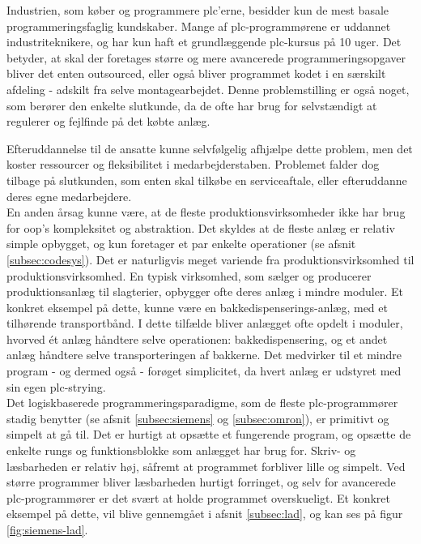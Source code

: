 \noindent Industrien, som køber og programmere \gls{plc}'erne, besidder kun de mest basale programmeringsfaglig kundskaber. Mange af \gls{plc}-programmørene er uddannet industriteknikere, og har kun haft et grundlæggende \gls{plc}-kursus på 10 uger. Det betyder, at skal der foretages større og mere avancerede programmeringsopgaver bliver det enten outsourced, eller også bliver programmet kodet i en særskilt afdeling - adskilt fra selve montagearbejdet. Denne problemstilling er også noget, som berører den enkelte slutkunde, da de ofte har brug for selvstændigt at regulerer og fejlfinde på det købte anlæg.

Efteruddannelse til de ansatte kunne selvfølgelig afhjælpe dette problem, men det koster ressourcer og fleksibilitet i medarbejderstaben. Problemet falder dog tilbage på slutkunden, som enten skal tilkøbe en serviceaftale, eller efteruddanne deres egne medarbejdere. \\

\noindent En anden årsag kunne være, at de fleste produktionsvirksomheder ikke har brug for \gls{oop}'s kompleksitet og abstraktion. Det skyldes at de fleste anlæg er relativ simple opbygget, og kun foretager et par enkelte operationer (se afsnit \ref{subsec:codesys}). Det er naturligvis meget variende fra produktionsvirksomhed til produktionsvirksomhed. En typisk virksomhed, som sælger og producerer produktionsanlæg til slagterier, opbygger ofte deres anlæg i mindre moduler. Et konkret eksempel på dette, kunne være en bakkedispenserings-anlæg, med et tilhørende transportbånd. I dette tilfælde bliver anlægget ofte opdelt i moduler, hvorved ét anlæg håndtere selve operationen: bakkedispensering, og et andet anlæg håndtere selve transporteringen af bakkerne. Det medvirker til et mindre program - og dermed også - forøget simplicitet, da hvert anlæg er udstyret med sin egen \gls{plc}-strying. \\

\noindent Det logiskbaserede programmeringsparadigme, som de fleste \gls{plc}-programmører stadig benytter (se afsnit \ref{subsec:siemens} og \ref{subsec:omron}), er primitivt og simpelt at gå til. Det er hurtigt at opsætte et fungerende program, og opsætte de enkelte rungs og funktionsblokke som anlægget har brug for. Skriv- og læsbarheden er relativ høj, såfremt at programmet forbliver lille og simpelt. Ved større programmer bliver læsbarheden hurtigt forringet, og selv for avancerede \gls{plc}-programmører er det svært at holde programmet overskueligt. Et konkret eksempel på dette, vil blive gennemgået i afsnit \ref{subsec:lad}, og kan ses på figur \ref{fig:siemens-lad}. 

